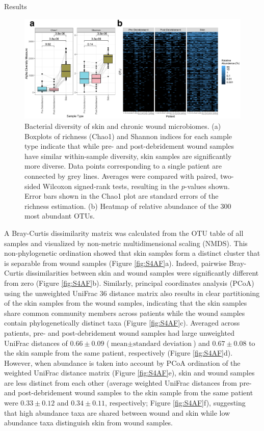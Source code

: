 \documentclass[oneside,12pt,final]{sty/ucthesis-CA2012}
\begin{document}
\begin{mainmatter}
\begin{section}{Results}
\begin{figure}
\centering
\centerline{\includegraphics[width=\textwidth]{fig/C3figS3AB.pdf}}
\caption{Bacterial diversity of skin and chronic wound microbiomes. (a) Boxplots of richness (Chao1) and Shannon indices for each sample type indicate that while pre- and post-debridement wound samples have similar within-sample diversity, skin samples are significantly more diverse. Data points corresponding to a single patient are connected by grey lines. Averages were compared with paired, two-sided Wilcoxon signed-rank tests, resulting in the $p$-values shown. Error bars shown in the Chao1 plot are standard errors of the richness estimation. (b) Heatmap of relative abundance of the 300 most abundant OTUs.}
\label{fig:S3AB}
\end{figure}

A Bray-Curtis dissimilarity matrix was calculated from the OTU table of all samples and visualized by non-metric multidimensional scaling (NMDS). This non-phylogenetic ordination showed that skin samples form a distinct cluster that is separable from wound samples (Figure \ref{fig:S4AF}a). Indeed, pairwise Bray-Curtis dissimilarities between skin and wound samples were significantly different from zero (Figure \ref{fig:S4AF}b). Similarly, principal coordinates analysis (PCoA) using the unweighted UniFrac 36 distance matrix also results in clear partitioning of the skin samples from the wound samples, indicating that the skin samples share common community members across patients while the wound samples contain phylogenetically distinct taxa (Figure \ref{fig:S4AF}c). Averaged across patients, pre- and post-debridement wound samples had large unweighted UniFrac distances of $0.66 \pm 0.09$ ($\text{mean} \pm \text{standard deviation}$) and $0.67 \pm 0.08$ to the skin sample from the same patient, respectively (Figure \ref{fig:S4AF}d). However, when abundance is taken into account by PCoA ordination of the weighted UniFrac distance matrix (Figure \ref{fig:S4AF}e), skin and wound samples are less distinct from each other (average weighted UniFrac distances from pre- and post-debridement wound samples to the skin sample from the same patient were $0.33 \pm 0.12$ and $0.34 \pm 0.11$, respectively; Figure \ref{fig:S4AF}f), suggesting that high abundance taxa are shared between wound and skin while low abundance taxa distinguish skin from wound samples.


\end{section}
\end{mainmatter}
\end{document}
